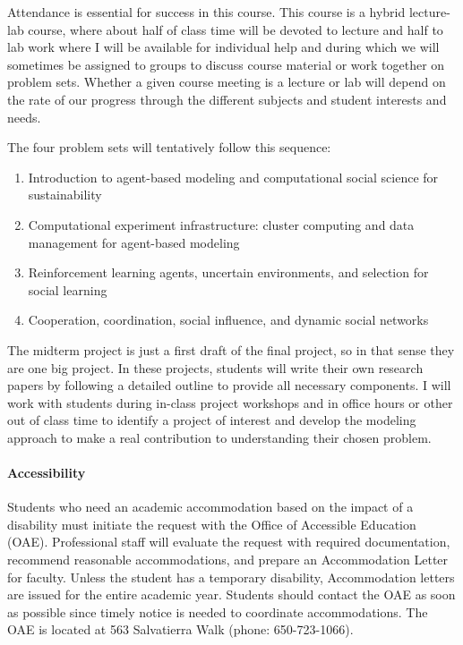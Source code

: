\documentclass[
  letterpaper,
  DIV=11,
  numbers=noendperiod]{scrartcl}
\let\oldparagraph\paragraph
\renewcommand{\paragraph}[1]{\oldparagraph{#1}\mbox{}}
\providecommand{\tightlist}{%
  \setlength{\itemsep}{0pt}\setlength{\parskip}{0pt}}\usepackage{longtable,booktabs,array}
\begin{document}
Attendance is essential for success in this course. This course is a
hybrid lecture-lab course, where about half of class time will be
devoted to lecture and half to lab work where I will be available for
individual help and during which we will sometimes be assigned to groups
to discuss course material or work together on problem sets. Whether a
given course meeting is a lecture or lab will depend on the rate of our
progress through the different subjects and student interests and needs.

The four problem sets will tentatively follow this sequence:

\begin{enumerate}
\def\labelenumi{\arabic{enumi}.}
\tightlist
\item
  Introduction to agent-based modeling and computational social science
  for sustainability
\item
  Computational experiment infrastructure: cluster computing and data
  management for agent-based modeling
\item
  Reinforcement learning agents, uncertain environments, and selection
  for social learning
\item
  Cooperation, coordination, social influence, and dynamic social
  networks
\end{enumerate}

The midterm project is just a first draft of the final project, so in
that sense they are one big project. In these projects, students will
write their own research papers by following a detailed outline to
provide all necessary components. I will work with students during
in-class project workshops and in office hours or other out of class
time to identify a project of interest and develop the modeling approach
to make a real contribution to understanding their chosen problem.

\paragraph{Accessibility}\label{accessibility}

Students who need an academic accommodation based on the impact of a
disability must initiate the request with the Office of Accessible
Education (OAE). Professional staff will evaluate the request with
required documentation, recommend reasonable accommodations, and prepare
an Accommodation Letter for faculty. Unless the student has a temporary
disability, Accommodation letters are issued for the entire academic
year. Students should contact the OAE as soon as possible since timely
notice is needed to coordinate accommodations. The OAE is located at 563
Salvatierra Walk (phone: 650-723-1066).
\end{document}
